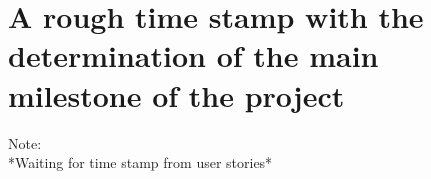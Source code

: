 \section{A rough time stamp with the determination of the main milestone of the project}

Note:\\
*Waiting for time stamp from user stories*